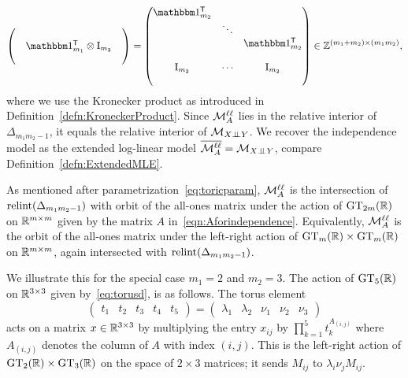 \begin{example}
\begin{equation}
\begin{pmatrix}
				& & \\ 
				& \ones\T_{m_1} \otimes \Id_{m_2} & \\ & &  \end{pmatrix}
			= \begin{pmatrix}
				\ones\T_{m_2} & & \\ & \ddots & \\ & & \ones\T_{m_2}  \\ 
				& & \\ \Id_{m_2} & \cdots & \Id_{m_2} \\ & &
			\end{pmatrix}
		\in \ZZ^{(m_1 + m_2) \times (m_1 m_2)},
		\end{equation}
	where we use the Kronecker product as introduced in Definition~\ref{defn:KroneckerProduct}. Since $\mathcal{M}^{\mathtt{\ell \ell}}_A$ lies in the relative interior of $\Delta_{m_1 m_2 -1}$, it equals the relative interior of $\mathcal{M}_{X {\perp\!\!\!\perp} Y}$. We recover the independence model as the extended log-linear model $\overline{\mathcal{M}^{\mathtt{\ell \ell}}_A} = \mathcal{M}_{X {\perp\!\!\!\perp} Y}$, compare Definition~\ref{defn:ExtendedMLE}.
	
	As mentioned after parametrization~\eqref{eq:toricparam}, $\mathcal{M}^{\mathtt{\ell \ell}}_A$ is the intersection of $\operatorname{relint}(\Delta_{m_1 m_2 -1})$ with orbit of the all-ones matrix under the action of $\operatorname{GT}_{2m}(\mathbb R)$ on $\mathbb R^{m \times m}$ given by the matrix $A$ in~\eqref{eqn:Aforindependence}.
	Equivalently, $\mathcal{M}^{\mathtt{\ell \ell}}_A$ is the orbit of the all-ones matrix under the left-right action of $\operatorname{GT}_m(\mathbb R) \times \operatorname{GT}_m(\mathbb R)$ on $\mathbb R^{m \times m}$, again intersected with $\operatorname{relint}(\Delta_{m_1 m_2 -1})$.
	
	We illustrate this for the special case $m_1 = 2$ and $m_2=3$.
	The action of $\operatorname{GT}_5(\mathbb R)$ on $\mathbb R^{3 \times 3}$ given by~\eqref{eq:torusd}, is as follows. The torus element 
	\[ \left( \begin{matrix} t_1 & t_2 & t_3 & t_4 & t_5 \end{matrix} \right) = \left( \begin{matrix} \lambda_1 & \lambda_2 & \nu_1 & \nu_2 & \nu_3 \end{matrix} \right) \]
	acts on a matrix $x \in \mathbb R^{3 \times 3}$ by multiplying the entry $x_{ij}$ by $\prod_{k = 1}^5 t_k^{A_{(i,j)}}$ where $A_{(i,j)}$ denotes the column of $A$ with  index $(i,j)$.
	This is the left-right action of $\operatorname{GT}_2(\mathbb R) \times \operatorname{GT}_3(\mathbb R)$ on the space of $2 \times 3$ matrices; it sends $M_{ij}$ to $\lambda_i \nu_j M_{ij}$.
	\hfill\exSymbol
\end{example}

